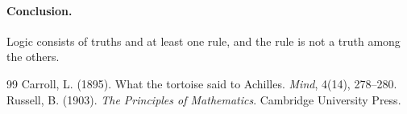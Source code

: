 \documentclass{situationist-preprint}
\begin{document}
\paragraph{Conclusion.} Logic consists of truths and at least one rule, and the rule is not a truth among the others.

\begin{thebibliography}{99}\small
{} Carroll, L. (1895). What the tortoise said to Achilles. \emph{Mind}, 4(14), 278--280.
 Russell, B. (1903). \emph{The Principles of Mathematics}. Cambridge University Press.
\end{thebibliography}
\end{document}
